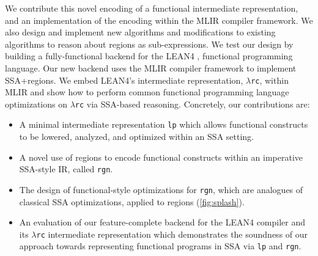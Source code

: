 \documentclass[conference]{IEEEtran}
\newcommand{\lp}{\textcolor{pairedTwoDarkBlue}{\texttt{lp}}}
\newcommand{\rgn}{\textcolor{pairedSixDarkRed}{\texttt{rgn}}}
\newcommand{\lambdarc}{\ensuremath{\lambda}\texttt{rc}}
\begin{document}
We contribute this novel encoding of a functional intermediate representation,
and an implementation of the encoding within the MLIR compiler framework. We also design
and implement new algorithms and modifications to existing
algorithms to reason about regions as sub-expressions. We test our design
by building a fully-functional backend for the LEAN4 \cite{moura2021lean}, functional programming language.
Our new backend uses the MLIR compiler framework to implement SSA+regions. We embed
LEAN4's intermediate representation, \lambdarc{}, within MLIR and show how to perform
common functional programming language optimizations on \lambdarc{} via SSA-based reasoning.
Concretely, our contributions are:
\begin{itemize}
    \item A minimal intermediate representation \lp{} which allows functional constructs
    to be lowered, analyzed, and optimized within an SSA setting.
  \item A novel use of regions to encode functional constructs within an imperative SSA-style IR, called \rgn{}.
  \item The design of functional-style optimizations for \rgn{}, which are analogues of
    classical SSA optimizations, applied to regions (\autoref{fig:splash}).
    \item An evaluation of our feature-complete backend for the LEAN4
      compiler and its \lambdarc{} intermediate representation which demonstrates
      the soundness of our approach towards representing functional programs in SSA via \lp{} and \rgn{}.
\end{itemize}
\end{document}
